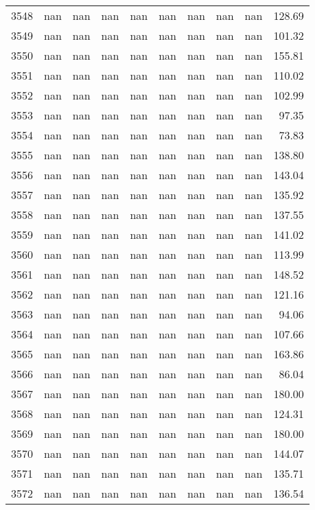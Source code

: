 \begin{tabular}{lrrrrrrrrr}
3548 & nan & nan & nan & nan & nan & nan & nan & nan & 128.69 \\
3549 & nan & nan & nan & nan & nan & nan & nan & nan & 101.32 \\
3550 & nan & nan & nan & nan & nan & nan & nan & nan & 155.81 \\
3551 & nan & nan & nan & nan & nan & nan & nan & nan & 110.02 \\
3552 & nan & nan & nan & nan & nan & nan & nan & nan & 102.99 \\
3553 & nan & nan & nan & nan & nan & nan & nan & nan & 97.35 \\
3554 & nan & nan & nan & nan & nan & nan & nan & nan & 73.83 \\
3555 & nan & nan & nan & nan & nan & nan & nan & nan & 138.80 \\
3556 & nan & nan & nan & nan & nan & nan & nan & nan & 143.04 \\
3557 & nan & nan & nan & nan & nan & nan & nan & nan & 135.92 \\
3558 & nan & nan & nan & nan & nan & nan & nan & nan & 137.55 \\
3559 & nan & nan & nan & nan & nan & nan & nan & nan & 141.02 \\
3560 & nan & nan & nan & nan & nan & nan & nan & nan & 113.99 \\
3561 & nan & nan & nan & nan & nan & nan & nan & nan & 148.52 \\
3562 & nan & nan & nan & nan & nan & nan & nan & nan & 121.16 \\
3563 & nan & nan & nan & nan & nan & nan & nan & nan & 94.06 \\
3564 & nan & nan & nan & nan & nan & nan & nan & nan & 107.66 \\
3565 & nan & nan & nan & nan & nan & nan & nan & nan & 163.86 \\
3566 & nan & nan & nan & nan & nan & nan & nan & nan & 86.04 \\
3567 & nan & nan & nan & nan & nan & nan & nan & nan & 180.00 \\
3568 & nan & nan & nan & nan & nan & nan & nan & nan & 124.31 \\
3569 & nan & nan & nan & nan & nan & nan & nan & nan & 180.00 \\
3570 & nan & nan & nan & nan & nan & nan & nan & nan & 144.07 \\
3571 & nan & nan & nan & nan & nan & nan & nan & nan & 135.71 \\
3572 & nan & nan & nan & nan & nan & nan & nan & nan & 136.54 \\

\end{tabular}
